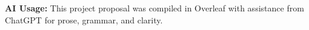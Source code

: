 \documentclass[sigconf, nonacm]{acmart}
\begin{document}
\nocite{*}









\noindent\textbf{AI Usage:} This project proposal was compiled in Overleaf with assistance from ChatGPT for prose, grammar, and clarity.
\end{document}
